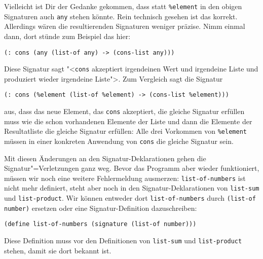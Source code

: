 Vielleicht ist Dir der Gedanke gekommen, dass statt
\lstinline{%element} in den obigen Signaturen auch \lstinline{any}
stehen könnte.  Rein technisch gesehen ist das korrekt.  Allerdings
wären die resultierenden Signaturen weniger präzise.  Nimm einmal
dann, dort stünde zum Beispiel das hier:
%
\begin{lstlisting}
(: cons (any (list-of any) -> (cons-list any)))
\end{lstlisting}
%
Diese Signatur sagt "<\lstinline{cons} akzeptiert irgendeinen Wert und
irgendeine Liste und produziert wieder irgendeine Liste">.  Zum
Vergleich sagt die Signatur
%
\begin{lstlisting}
(: cons (%element (list-of %element) -> (cons-list %element)))
\end{lstlisting}
%
aus, dass das neue Element, das \lstinline{cons} akzeptiert, die
gleiche Signatur erfüllen muss wie die schon vorhandenen Elemente der
Liste und dann die Elemente der Resultatliste die gleiche Signatur
erfüllen: Alle drei Vorkommen von \lstinline{%element} müssen in einer
konkreten Anwendung von \lstinline{cons} die gleiche Signatur sein.

Mit diesen Änderungen an den Signatur-Deklarationen gehen die
Signatur"=Verletzungen ganz weg.  Bevor das Programm aber wieder
funktioniert, müssen wir noch eine weitere Fehlermeldung
ausmerzen: \lstinline{list-of-numbers} ist nicht mehr
definiert, steht aber noch in den Signatur-Deklarationen von
\lstinline{list-sum} und \lstinline{list-product}.  Wir können
entweder dort \lstinline{list-of-numbers} durch \lstinline{(list-of number)}
ersetzen oder eine Signatur-Definition
dazuschreiben:
%
\begin{lstlisting}
(define list-of-numbers (signature (list-of number)))
\end{lstlisting}
%
Diese Definition muss vor den Definitionen von \lstinline{list-sum}
und \lstinline{list-product} stehen, damit sie dort bekannt ist.


